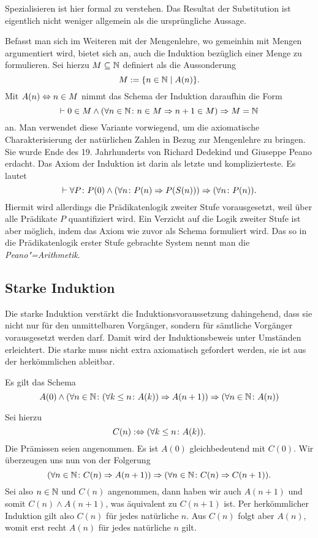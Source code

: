 \noindent
Spezialisieren ist hier formal zu verstehen. Das Resultat
der Substitution ist eigentlich nicht weniger allgemein als die
ursprüngliche Aussage.

Befasst man sich im Weiteren mit der Mengenlehre, wo gemeinhin mit
Mengen argumentiert wird, bietet sich an, auch die Induktion bezüglich
einer Menge zu formulieren. Sei hierzu $M\subseteq\mathbb N$ definiert als
die Aussonderung
\[M := \{n\in\mathbb N\mid A(n)\}.\]
Mit $A(n)\Leftrightarrow n\in M$ nimmt das Schema der Induktion daraufhin die Form
\[\vdash 0\in M\land (\forall n\in\mathbb N\colon n\in M\Rightarrow n+1\in M)\Rightarrow M = \mathbb N\]
an. Man verwendet diese Variante vorwiegend, um die axiomatische
Charakterisierung der natürlichen Zahlen in Bezug zur Mengenlehre zu
bringen. Sie wurde Ende des 19. Jahrhunderts von Richard Dedekind und
Giuseppe Peano erdacht. Das Axiom der Induktion ist darin als letzte
und komplizierteste. Es lautet
\[\vdash \forall P\colon P(0)\land (\forall n\colon P(n)\Rightarrow P(S(n)))
\Rightarrow (\forall n\colon P(n)).\]
Hiermit wird allerdings die Prädikatenlogik zweiter Stufe vorausgesetzt,
weil über alle Prädikate $P$ quantifiziert wird. Ein Verzicht auf die
Logik zweiter Stufe ist aber möglich, indem das Axiom wie zuvor als
Schema formuliert wird. Das so in die Prädikatenlogik erster Stufe gebrachte
System nennt man die \emph{Peano"=Arithmetik}.

\subsection{Starke Induktion}

Die starke Induktion verstärkt die Induktionsvoraussetzung
dahingehend, dass sie nicht nur für den unmittelbaren Vorgänger, sondern
für sämtliche Vorgänger vorausgesetzt werden darf. Damit wird der
Induktionsbeweis unter Umständen erleichtert. Die starke muss nicht
extra axiomatisch gefordert werden, sie ist aus der herkömmlichen
ableitbar.
\begin{Satz}
Es gilt das Schema
\[A(0)\land (\forall n\in\mathbb N\colon (\forall k\le n\colon A(k))\Rightarrow A(n+1))
\Rightarrow (\forall n\in\mathbb N\colon A(n))\]
\end{Satz}
\begin{Beweis}
Sei hierzu
\[C(n) :\Leftrightarrow (\forall k\le n\colon A(k)).\]
Die Prämissen seien angenommen. Es ist $A(0)$
gleichbedeutend mit $C(0)$. Wir überzeugen uns nun von der Folgerung
\[(\forall n\in\mathbb N\colon C(n)\Rightarrow A(n+1))\Rightarrow (\forall n\in \mathbb N\colon C(n)\Rightarrow C(n+1)).\]
Sei also $n\in\mathbb N$ und $C(n)$ angenommen, dann haben wir auch $A(n+1)$
und somit $C(n)\land A(n+1)$, was äquivalent zu $C(n+1)$ ist. Per
herkömmlicher Induktion gilt also $C(n)$ für jedes natürliche
$n$. Aus $C(n)$ folgt aber $A(n)$, womit erst recht $A(n)$ für jedes
natürliche $n$ gilt.\,\qedsymbol
\end{Beweis}

